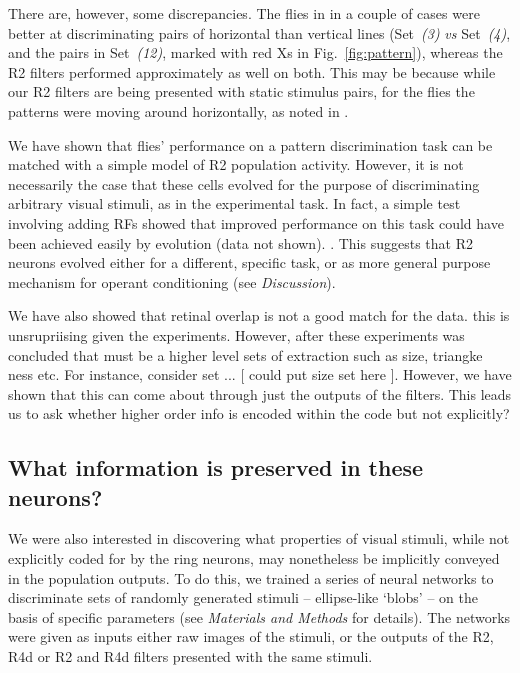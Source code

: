 There are, however, some discrepancies.
The flies in \cite{Ernst1999} in a couple of cases were better at discriminating pairs of horizontal than vertical lines (Set~\emph{(3)} \emph{vs} Set~\emph{(4)}, and the pairs in Set~\emph{(12)}, marked with red Xs in Fig.~\ref{fig:pattern}), whereas the R2 filters performed approximately as well on both.
This may be because while our R2 filters are being presented with static stimulus pairs, for the flies the patterns were moving around horizontally, as noted in \cite{Ernst1999}.
 

We have shown that flies' performance on a pattern discrimination task can be matched with a simple model of R2 population activity.
However, it is not necessarily the case that these cells evolved for the purpose of discriminating arbitrary visual stimuli, as in the experimental task.
In fact, a simple test involving adding RFs showed that improved performance on this task could have been achieved easily by evolution (data not shown). . This suggests that R2 neurons evolved either for a different, specific task, or as more general purpose mechanism for operant conditioning (see \emph{Discussion}). 

 We have also showed that retinal overlap is not a good match for the data. this is unsrupriising given the experiments. 
However, after these experiments was concluded that must be a higher level sets of extraction such as size, triangke ness etc. For instance, consider set ... [ could put size set here ]. 
However, we have shown that this can come about through just the outputs of the filters.  This leads us to ask whether higher order info is encoded within the code but not explicitly?

\subsection{What information is preserved in these neurons?}

We were also interested in discovering what properties of visual stimuli, while not explicitly coded for by the ring neurons, may nonetheless be implicitly conveyed in the population outputs.
To do this, we trained a series of neural networks to discriminate sets of randomly generated stimuli -- ellipse-like `blobs' -- on the basis of specific parameters (see \emph{Materials and Methods} for details).
The networks were given as inputs either raw images of the stimuli, or the outputs of the R2, R4d or R2 and R4d filters presented with the same stimuli.

